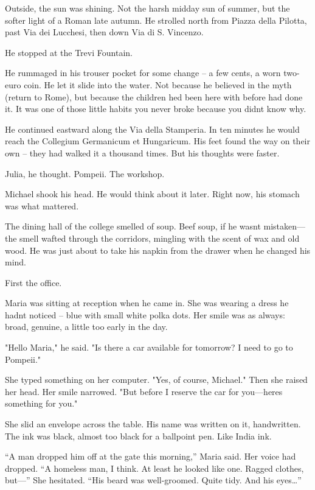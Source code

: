 \documentclass[
]{article}
\begin{document}
Outside, the sun was shining. Not the harsh midday sun of summer, but the softer light of a Roman late autumn. He strolled north from Piazza della Pilotta, past Via dei Lucchesi, then down Via di S. Vincenzo.

He stopped at the Trevi Fountain.

He rummaged in his trouser pocket for some change -- a few cents, a worn two-euro coin. He let it slide into the water. Not because he believed in the myth (return to Rome), but because the children he\textquotesingle d been here with before had done it. It was one of those little habits you never broke because you didn\textquotesingle t know why.

He continued eastward along the Via della Stamperia. In ten minutes he would reach the Collegium Germanicum et Hungaricum. His feet found the way on their own -- they had walked it a thousand times. But his thoughts were faster.

Julia, he thought. Pompeii. The workshop.

Michael shook his head. He would think about it later. Right now, his stomach was what mattered.

The dining hall of the college smelled of soup. Beef soup, if he wasn\textquotesingle t mistaken---the smell wafted through the corridors, mingling with the scent of wax and old wood. He was just about to take his napkin from the drawer when he changed his mind.

First the office.

Maria was sitting at reception when he came in. She was wearing a dress he hadn\textquotesingle t noticed -- blue with small white polka dots. Her smile was as always: broad, genuine, a little too early in the day.

"Hello Maria," he said. "Is there a car available for tomorrow? I need to go to Pompeii."

She typed something on her computer. "Yes, of course, Michael." Then she raised her head. Her smile narrowed. "But before I reserve the car for you---here\textquotesingle s something for you."

She slid an envelope across the table. His name was written on it, handwritten. The ink was black, almost too black for a ballpoint pen. Like India ink.

``A man dropped him off at the gate this morning,'' Maria said. Her voice had dropped. ``A homeless man, I think. At least he looked like one. Ragged clothes, but---'' She hesitated. ``His beard was well-groomed. Quite tidy. And his eyes\ldots''
\end{document}
